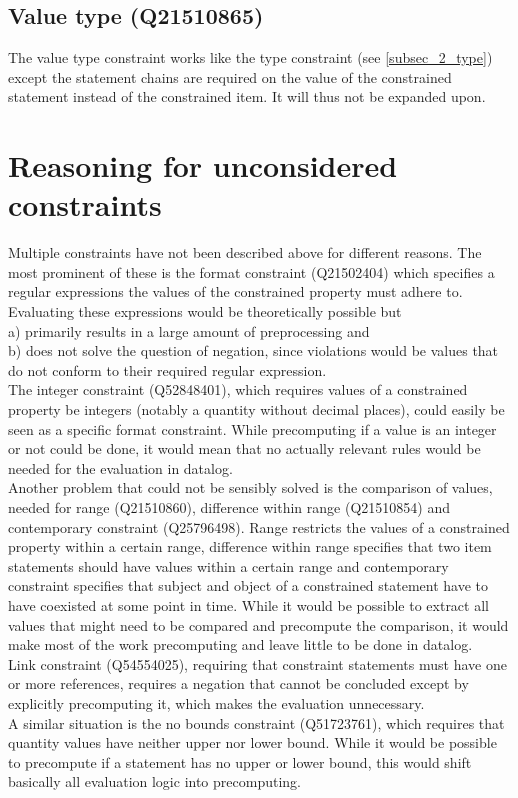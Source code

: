 \documentclass[hyperref,bachelorofscience,fleqn]{cgvpub}
\begin{document}
\subsection{Value type (Q21510865)}
The value type constraint works like the type constraint (see \ref{subsec_2_type}) except the statement chains are required on the value of the constrained statement instead of the constrained item. It will thus not be expanded upon.

\section{Reasoning for unconsidered constraints}
Multiple constraints have not been described above for different reasons. The most prominent of these is the format constraint (Q21502404) which specifies a regular expressions the values of the constrained property must adhere to. Evaluating these expressions would be theoretically possible but \\
a) primarily results in a large amount of preprocessing and\\
b) does not solve the question of negation, since violations would be values that do not conform to their required regular expression. \\

The integer constraint (Q52848401), which requires values of a constrained property be integers (notably a quantity without decimal places), could easily be seen as a specific format constraint. While precomputing if a value is an integer or not could be done, it would mean that no actually relevant rules would be needed for the evaluation in datalog. \\

Another problem that could not be sensibly solved is the comparison of values, needed for range (Q21510860), difference within range (Q21510854) and contemporary constraint (Q25796498). Range restricts the values of a constrained property within a certain range, difference within range specifies that two item statements should have values within a certain range and contemporary constraint specifies that subject and object of a constrained statement have to have coexisted at some point in time. While it would be possible to extract all values that might need to be compared and precompute the comparison, it would make most of the work precomputing and leave little to be done in datalog.\\

Link constraint (Q54554025), requiring that constraint statements must have one or more references, requires a negation that cannot be concluded except by explicitly precomputing it, which makes the evaluation unnecessary. \\
A similar situation is the no bounds constraint (Q51723761), which requires that quantity values have neither upper nor lower bound. While it would be possible to precompute if a statement has no upper or lower bound, this would shift basically all evaluation logic into precomputing.
\end{document}
